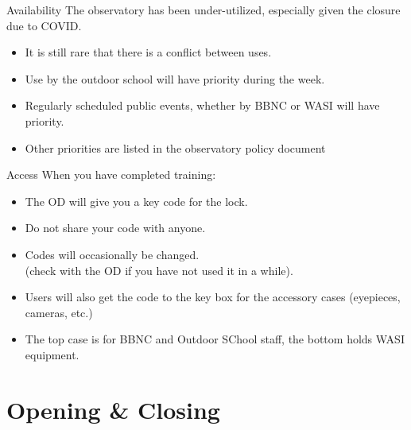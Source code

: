 
\begin{frame}{Availability}
  \Large
  The observatory has been under-utilized, especially given the closure due to COVID.
  \begin{itemize}
    \item It is still rare that there is a conflict between uses.
    \item Use by the outdoor school will have priority during the week.
    \item Regularly scheduled public events, whether by BBNC or WASI will have priority.
    \item Other priorities are listed in the observatory policy document
  \end{itemize}
\end{frame}


\begin{frame}{Access}
  \Large
  When you have completed training:
  \begin{itemize}
    \item The OD will give you a key code for the lock.
    \item Do not share your code with anyone.
    \item Codes will occasionally be changed.\\
      (check with the OD if you have not used it in a while).
    \item Users will also get the code to the key box for the accessory cases (eyepieces, cameras, etc.)
    \item The top case is for BBNC and Outdoor SChool staff, the bottom holds WASI equipment.
  \end{itemize}
\end{frame}


\section{Opening \& Closing}

